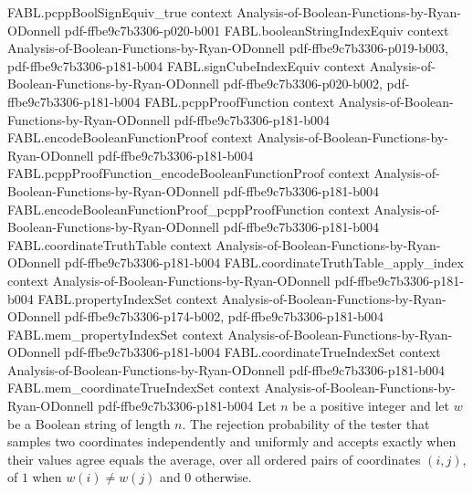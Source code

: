 \begin{theorem}
\proofstep
  {FABL.pcppBoolSignEquiv_true}
  {context}
  {Analysis-of-Boolean-Functions-by-Ryan-ODonnell}
  {pdf-ffbe9c7b3306-p020-b001}
\proofstep
  {FABL.booleanStringIndexEquiv}
  {context}
  {Analysis-of-Boolean-Functions-by-Ryan-ODonnell}
  {pdf-ffbe9c7b3306-p019-b003,
    pdf-ffbe9c7b3306-p181-b004}
\proofstep
  {FABL.signCubeIndexEquiv}
  {context}
  {Analysis-of-Boolean-Functions-by-Ryan-ODonnell}
  {pdf-ffbe9c7b3306-p020-b002,
    pdf-ffbe9c7b3306-p181-b004}
\proofstep
  {FABL.pcppProofFunction}
  {context}
  {Analysis-of-Boolean-Functions-by-Ryan-ODonnell}
  {pdf-ffbe9c7b3306-p181-b004}
\proofstep
  {FABL.encodeBooleanFunctionProof}
  {context}
  {Analysis-of-Boolean-Functions-by-Ryan-ODonnell}
  {pdf-ffbe9c7b3306-p181-b004}
\proofstep
  {FABL.pcppProofFunction_encodeBooleanFunctionProof}
  {context}
  {Analysis-of-Boolean-Functions-by-Ryan-ODonnell}
  {pdf-ffbe9c7b3306-p181-b004}
\proofstep
  {FABL.encodeBooleanFunctionProof_pcppProofFunction}
  {context}
  {Analysis-of-Boolean-Functions-by-Ryan-ODonnell}
  {pdf-ffbe9c7b3306-p181-b004}
\proofstep
  {FABL.coordinateTruthTable}
  {context}
  {Analysis-of-Boolean-Functions-by-Ryan-ODonnell}
  {pdf-ffbe9c7b3306-p181-b004}
\proofstep
  {FABL.coordinateTruthTable_apply_index}
  {context}
  {Analysis-of-Boolean-Functions-by-Ryan-ODonnell}
  {pdf-ffbe9c7b3306-p181-b004}
\proofstep
  {FABL.propertyIndexSet}
  {context}
  {Analysis-of-Boolean-Functions-by-Ryan-ODonnell}
  {pdf-ffbe9c7b3306-p174-b002,
    pdf-ffbe9c7b3306-p181-b004}
\proofstep
  {FABL.mem_propertyIndexSet}
  {context}
  {Analysis-of-Boolean-Functions-by-Ryan-ODonnell}
  {pdf-ffbe9c7b3306-p181-b004}
\proofstep
  {FABL.coordinateTrueIndexSet}
  {context}
  {Analysis-of-Boolean-Functions-by-Ryan-ODonnell}
  {pdf-ffbe9c7b3306-p181-b004}
\proofstep
  {FABL.mem_coordinateTrueIndexSet}
  {context}
  {Analysis-of-Boolean-Functions-by-Ryan-ODonnell}
  {pdf-ffbe9c7b3306-p181-b004}
Let $n$ be a positive integer and let $w$ be a Boolean string of length $n$. The
rejection probability of the tester that samples two coordinates independently and
uniformly and accepts exactly when their values agree equals the average, over all
ordered pairs of coordinates $(i,j)$, of $1$ when $w(i)\ne w(j)$ and $0$ otherwise.
\end{theorem}

